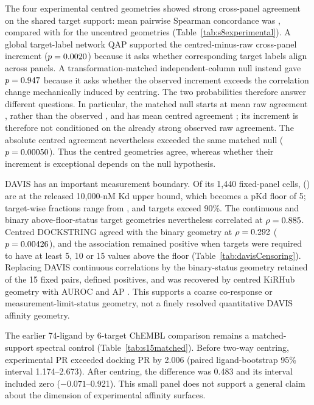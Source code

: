 \documentclass[11pt]{article}
\begin{document}
The four experimental centred geometries showed strong cross-panel agreement on the shared
target support: mean pairwise Spearman concordance was \CrossPanelCentered{}, compared with
\CrossPanelRaw{} for the uncentred geometries (Table~\ref{tab:s8experimental}). A global
target-label network QAP supported the centred-minus-raw cross-panel increment
($p=0.0020{}$) because it asks whether corresponding target labels align
across panels. A transformation-matched independent-column null instead gave
$p=0.947{}$ because it asks whether the observed increment exceeds the
correlation change mechanically induced by centring. The two probabilities therefore answer
different questions. In particular, the matched null starts at mean raw agreement
\CrossPanelMatchedRawNullMean{}, rather than the observed \CrossPanelRaw{}, and has mean
centred agreement \CrossPanelMatchedCenteredNullMean{}; its increment is therefore not
conditioned on the already strong observed raw agreement. The absolute centred agreement
nevertheless exceeded the same matched null
($p=0.00050{}$). Thus the centred geometries agree, whereas
whether their increment is exceptional depends on the null hypothesis.

DAVIS has an important measurement boundary. Of its 1,440 fixed-panel cells,
\DavisFloorCells{} (\DavisFloorPercent{}) are at the released 10,000-nM Kd upper bound,
which becomes a pKd floor of 5; target-wise fractions range from \DavisFloorRange{}, and
\DavisHighFloorTargets{} targets exceed 90\%. The continuous and binary
above-floor-status target geometries nevertheless correlated at
$\rho=0.885{}$. Centred DOCKSTRING agreed with the binary geometry at
$\rho=0.292{}$ ($p=0.00426{}$), and the association
remained positive when targets were required to have at least 5, 10 or 15 values above
the floor (Table~\ref{tab:davisCensoring}). Replacing DAVIS continuous correlations by
the binary-status geometry retained \DavisCensorAltShared{} of the 15 fixed pairs,
defined \DavisCensorAltTotal{} positives, and was recovered by centred KiRHub geometry
with AUROC \DavisCensorAltAUROC{} and AP \DavisCensorAltAP{}. This supports a coarse
co-response or measurement-limit-status geometry, not a finely resolved quantitative
DAVIS affinity geometry.

The earlier 74-ligand by 6-target ChEMBL comparison remains a matched-support spectral
control (Table~\ref{tab:s15matched}). Before two-way centring, experimental PR exceeded
docking PR by 2.006 (paired ligand-bootstrap 95\% interval 1.174--2.673). After centring,
the difference was 0.483 and its interval included zero ($-0.071$--0.921). This small panel
does not support a general claim about the dimension of experimental affinity surfaces.
\end{document}
